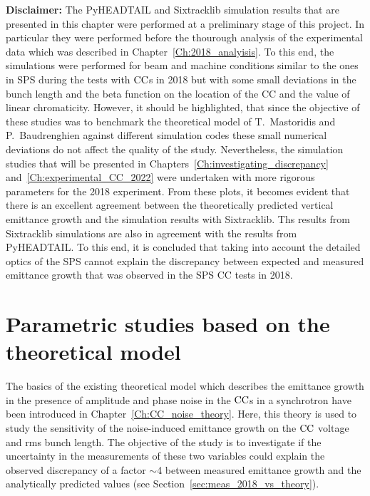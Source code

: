 
\textbf{Disclaimer:} The PyHEADTAIL and Sixtracklib simulation results that are presented in this chapter were performed at a preliminary stage of this project. In  particular they were performed before the thourough analysis of the experimental data which was described in Chapter~\ref{Ch:2018_analyisis}. To this end, the simulations were performed for beam and machine conditions similar to the ones in SPS during the tests with ${\mathrm{CC}}$s in 2018 but with some small deviations in the bunch length and the beta function on the location of the CC and the value of linear chromaticity. However, it should be highlighted, that since the objective of these studies was to benchmark the theoretical model of T.~Mastoridis and P.~Baudrenghien against different simulation codes these small numerical deviations do not affect the quality of the study. Nevertheless, the simulation studies that will be presented in Chapters~\ref{Ch:investigating_discrepancy} and~\ref{Ch:experimental_CC_2022} were undertaken with more rigorous parameters for the 2018 experiment.
From these plots, it becomes evident that there is an excellent agreement between the theoretically predicted vertical emittance growth and the simulation results with Sixtracklib. Ths results from Sixtracklib simulations are also in agreement with the results from PyHEADTAIL. To this end, it is concluded that taking into account the detailed optics of the SPS cannot explain the discrepancy between expected and measured emittance growth that was observed in the SPS CC tests in 2018.

\section{Parametric studies based on the theoretical model}\label{sec:paramteric_studies_theory}

The basics of the existing theoretical model which describes the emittance growth in the presence of amplitude and phase noise in the ${\mathrm{CC}}$s in a synchrotron have been introduced in Chapter~\ref{Ch:CC_noise_theory}. Here, this theory is used to study the sensitivity of the noise-induced emittance growth on the ${\mathrm{CC}}$ voltage and rms bunch length. The objective of the study is to investigate if the uncertainty in the measurements of these two variables could explain the observed discrepancy of a factor $\sim$4 between measured emittance growth and the analytically predicted values (see Section~\ref{sec:meas_2018_vs_theory}).

